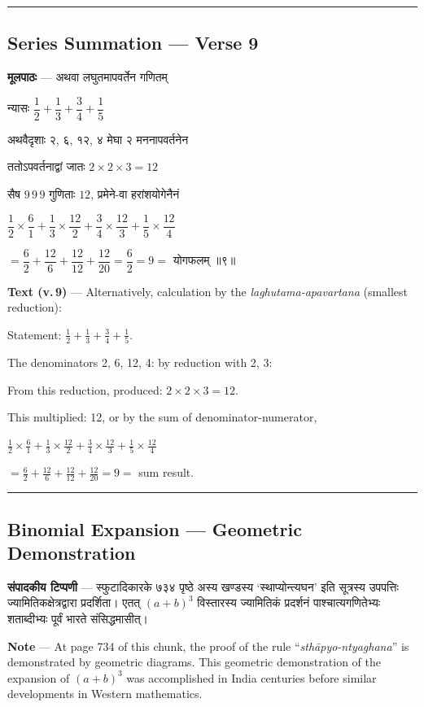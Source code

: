 \documentclass[11pt,a4paper]{article}
\newcommand{\skt}[1]{{\devanagarifont\color{sktcolor} #1}}
\newenvironment{bilingual}{%
  \par\noindent
  \begin{minipage}[t]{0.47\textwidth}%
}{%
  \par\end{minipage}%
}
\newcommand{\rightcol}{%
  \par\end{minipage}%
  \hfill
  \begin{minipage}[t]{0.47\textwidth}%
}
\begin{document}
\medskip
\noindent\rule{\textwidth}{0.4pt}

\subsection*{Series Summation --- Verse 9}

\begin{bilingual}
\textbf{मूलपाठः} --- \skt{अथवा लघुतमापवर्तेन गणितम्}

\skt{न्यासः} $\dfrac{1}{2} + \dfrac{1}{3} + \dfrac{3}{4} + \dfrac{1}{5}$

\skt{अथवैदृशाः २, ६, १२, ४ मेघा २ मननापवर्तनेन}

\skt{ततोऽपवर्तनाद्वां जातः} $2 \times 2 \times 3 = 12$

\skt{सैष} $9\,9\,9$ \skt{गुणिताः} $12$, \skt{प्रमेने-वा हरांशयोगेनैनं}

$\dfrac{1}{2} \times \dfrac{6}{1} + \dfrac{1}{3} \times \dfrac{12}{2} + \dfrac{3}{4} \times \dfrac{12}{3} + \dfrac{1}{5} \times \dfrac{12}{4}$

$= \dfrac{6}{2} + \dfrac{12}{6} + \dfrac{12}{12} + \dfrac{12}{20} = \dfrac{6}{2} = 9 = $ \skt{योगफलम्} ॥९॥
\rightcol
\textbf{Text (v.\,9)} --- Alternatively, calculation by the \textit{laghutama-apavartana} (smallest reduction):

Statement: $\frac{1}{2} + \frac{1}{3} + \frac{3}{4} + \frac{1}{5}$.

The denominators 2, 6, 12, 4: by reduction with 2, 3:

From this reduction, produced: $2 \times 2 \times 3 = 12$.

This multiplied: 12, or by the sum of denominator-numerator,

$\frac{1}{2} \times \frac{6}{1} + \frac{1}{3} \times \frac{12}{2} + \frac{3}{4} \times \frac{12}{3} + \frac{1}{5} \times \frac{12}{4}$

$= \frac{6}{2} + \frac{12}{6} + \frac{12}{12} + \frac{12}{20} = 9 = $ sum result.
\end{bilingual}

\medskip
\noindent\rule{\textwidth}{0.4pt}

\subsection*{Binomial Expansion --- Geometric Demonstration}

\begin{bilingual}
\textbf{संपादकीय टिप्पणी} --- \skt{स्फुटादिकारके ७३४ पृष्ठे अस्य खण्डस्य `स्थाप्योन्त्यघन' इति सूत्रस्य उपपत्तिः ज्यामितिकक्षेत्रद्वारा प्रदर्शिता। एतत् $(a+b)^3$ विस्तारस्य ज्यामितिकं प्रदर्शनं पाश्चात्यगणितेभ्यः शताब्दीभ्यः पूर्वं भारते संसिद्धमासीत्।}
\rightcol
\textbf{Note} --- At page 734 of this chunk, the proof of the rule ``\textit{sthāpyo-ntyaghana}'' is demonstrated by geometric diagrams. This geometric demonstration of the expansion of $(a+b)^3$ was accomplished in India centuries before similar developments in Western mathematics.
\end{bilingual}
\end{document}
